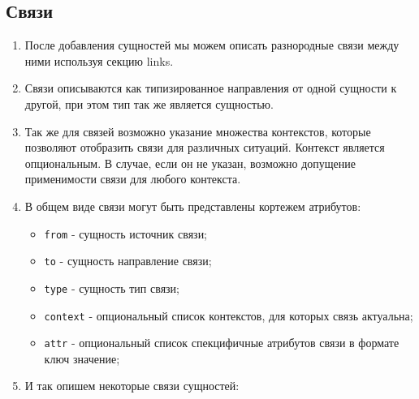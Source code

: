 \documentclass[final]{article}
\begin{document}
    \subsection{Связи}
        \begin{enumerate}

            \item После добавления сущностей мы можем описать разнородные связи 
            между ними используя секцию links.

            \item Связи описываются как типизированное направления от одной сущности 
            к другой, при этом тип так же является сущностью. 

            \item Так же для связей возможно указание множества контекстов, 
            которые позволяют отобразить связи для различных ситуаций. Контекст 
            является опциональным. В случае, если он не указан, возможно 
            допущение применимости связи для любого контекста.

            \item В общем виде связи могут быть представлены кортежем атрибутов:
            \begin{itemize}
                \item \texttt{from} - сущность источник связи;
                \item \texttt{to} - сущность направление связи;
                \item \texttt{type} - сущность тип связи;
                \item \texttt{context} - опциональный список контекстов, для которых связь актуальна;
                \item \texttt{attr} - опциональный список спекцифичные атрибутов 
                связи в формате ключ значение;
            \end{itemize}

            \item И так опишем некоторые связи сущностей:

            \begin{verbatim}


\end{verbatim}
\end{enumerate}
\end{document}
